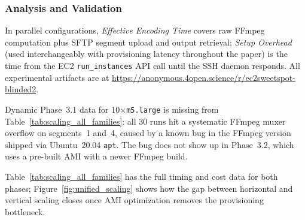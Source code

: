 \documentclass[conference]{IEEEtran}
\begin{document}
\subsubsection{Analysis and Validation}

In parallel configurations, \textit{Effective Encoding Time} covers raw FFmpeg computation plus SFTP segment upload and output retrieval; \textit{Setup Overhead} (used interchangeably with provisioning latency throughout the paper) is the time from the EC2 \texttt{run\_instances} API call until the SSH daemon responds. All experimental artifacts are at \url{https://anonymous.4open.science/r/ec2sweetspot-blinded2}.

Dynamic Phase~3.1 data for 10$\times$\texttt{m5.large} is missing from Table~\ref{tab:scaling_all_families}: all 30 runs hit a systematic FFmpeg muxer overflow on segments~1 and~4, caused by a known bug in the FFmpeg version shipped via Ubuntu~20.04 \texttt{apt}. The bug does not show up in Phase~3.2, which uses a pre-built AMI with a newer FFmpeg build.

Table~\ref{tab:scaling_all_families} has the full timing and cost data for both phases; Figure~\ref{fig:unified_scaling} shows how the gap between horizontal and vertical scaling closes once AMI optimization removes the provisioning bottleneck.
\end{document}

